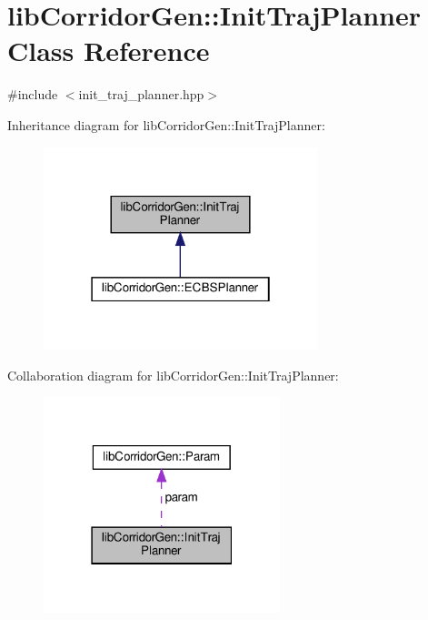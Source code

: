 \hypertarget{classlib_corridor_gen_1_1_init_traj_planner}{}\section{lib\+Corridor\+Gen\+:\+:Init\+Traj\+Planner Class Reference}
\label{classlib_corridor_gen_1_1_init_traj_planner}


{\ttfamily \#include $<$init\+\_\+traj\+\_\+planner.\+hpp$>$}



Inheritance diagram for lib\+Corridor\+Gen\+:\+:Init\+Traj\+Planner\+:
\nopagebreak
\begin{figure}[H]
\begin{center}
\leavevmode
\includegraphics[width=226pt]{classlib_corridor_gen_1_1_init_traj_planner__inherit__graph}
\end{center}
\end{figure}


Collaboration diagram for lib\+Corridor\+Gen\+:\+:Init\+Traj\+Planner\+:
\nopagebreak
\begin{figure}[H]
\begin{center}
\leavevmode
\includegraphics[width=195pt]{classlib_corridor_gen_1_1_init_traj_planner__coll__graph}
\end{center}
\end{figure}
